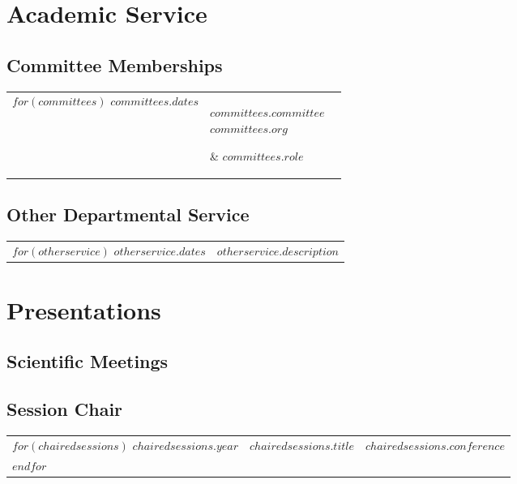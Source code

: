 \documentclass[martgin, line]{article}
\begin{document}
\section*{Academic Service}

\subsection*{Committee Memberships}

\setlength{\extrarowheight}{.75em}
\begin{longtable}[l]{lp{3.5in}l}
  $for(committees)$
  $committees.dates$& 
  \parbox[t]{3.5in} { $committees.committee$\\
    \scriptsize{%
      $committees.org$
    }} &  $committees.role$ \\
  $endfor$
\end{longtable}
\setlength{\extrarowheight}{0em}

\subsection*{Other Departmental Service}

\setlength{\extrarowheight}{.75em}
\begin{longtable}[l]{lp{5.5in}}
  $for(otherservice)$
  $otherservice.dates$& 
  \parbox[t]{5.5in} { 
    $otherservice.description$
  } \\
  $endfor$
\end{longtable}
\setlength{\extrarowheight}{0em}

\section*{Presentations}

\subsection*{Scientific Meetings}

\begin{enumerate}
  
\end{enumerate}

\subsection*{Session Chair}

\setlength{\extrarowheight}{.25em}
\begin{longtable}[l]{lll}
  $for(chairedsessions)$
  $chairedsessions.year$&
  $chairedsessions.title$&
  $chairedsessions.conference$\\
  $endfor$
\end{longtable}
\setlength{\extrarowheight}{0em}
\end{document}
